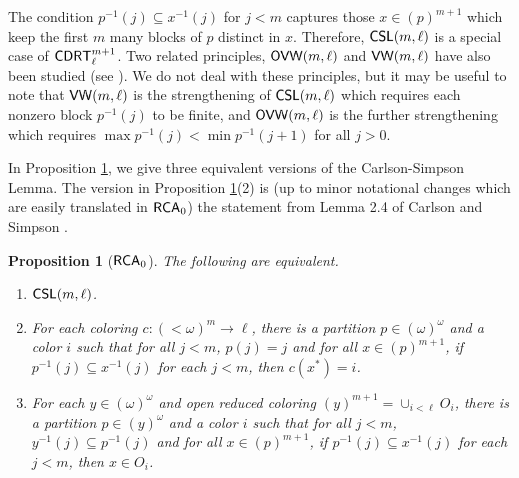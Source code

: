 \documentclass{amsart}
\newtheorem{prop}[thm]{Proposition}
\theoremstyle{definition}
\theoremstyle{remark}
\newcommand{\system}[1]{\mbox{\fontfamily{cmss}\fontshape{n}\fontseries{m}%
    \selectfont#1}}
\newcommand{\RCA}{\system{RCA}\ensuremath{_0}}
\newcommand{\CDRT}{\system{CDRT}}
\newcommand{\CSL}{\system{CSL}}
\newcommand{\OVW}{\system{OVW}}
\newcommand{\VW}{\system{VW}}
\newcommand{\block}[2]{{#1}^{-1}(#2)}
\begin{document}
The condition $\block{p}{j} \subseteq \block{x}{j}$ for $j < m$ captures those $x \in (p)^{m+1}$ which keep the first $m$ many blocks of $p$ distinct in $x$. Therefore, 
$\CSL(m,\ell)$ is a special case of $\CDRT^{m+1}_{\ell}$.
Two related principles, 
$\OVW(m,\ell)$ and $\VW(m,\ell)$ have also been studied 
(see \cite{ms, e, LiuMoninPatey}).  We do not deal with 
these principles, but it may be useful to note that $\VW(m,\ell)$ 
is the strengthening of $\CSL(m,\ell)$ which requires 
each nonzero block $\block{p}{j}$ to be finite, and $\OVW(m,\ell)$ 
is the further strengthening which requires 
$\max \block{p}{j} < \min \block{p}{j+1}$ for all $j>0$.  


In Proposition \ref{prop:csl_versions}, we give three equivalent versions of the Carlson-Simpson Lemma. 
The version in Proposition \ref{prop:csl_versions}(2) is (up to minor notational changes which are easily translated in $\RCA$) the statement from Lemma 2.4 of
Carlson and Simpson \cite{cs}. 

\begin{prop}[$\RCA$]
\label{prop:csl_versions}
The following are equivalent. 
\begin{enumerate}
\item[(1)] $\CSL(m,\ell)$.
\item[(2)] For each coloring $c:(<\omega)^m \rightarrow \ell$, there is a partition $p\in(\omega)^\omega$ and a color $i$ such that for all $j<m$, $p(j)=j$ and 
for all $x \in (p)^{m+1}$, if $\block{p}{j} \subseteq \block{x}{j}$ for each $j<m$, then $c(x^\ast)=i$.
\item[(3)] For each $y\in(\omega)^\omega$ and open reduced coloring $(y)^{m+1} = \cup_{i<\ell} O_i$, there is a partition $p \in (y)^\omega$ and a color $i$ such that 
for all $j < m$, $\block{y}{j}\subseteq \block{p}{j}$ and for all $x \in (p)^{m+1}$, if $\block{p}{j} \subseteq \block{x}{j}$ for each $j<m$, then $x \in O_i$.
\end{enumerate}
\end{prop}
\end{document}
